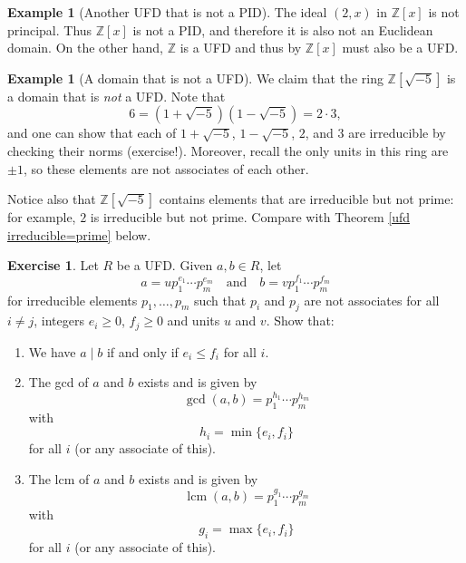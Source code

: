 \documentclass[12pt]{report}
\numberwithin{equation}{section}
\numberwithin{theorem}{chapter}
\theoremstyle{definition}
\newtheorem{example}[theorem]{Example}
\newtheorem{exercise}{Exercise}
\newtheorem*{basic properties}{Basic Properties}
\newtheorem*{Important Remark}{Important Remark}
\DeclareMathOperator{\lcm}{lcm}
\begin{document}
\begin{example}[Another UFD that is not a PID]
The ideal $(2,x)$ in $\mathbb{Z}[x]$ is not principal. Thus $\mathbb{Z}[x]$ is not a PID, and therefore it is also not an Euclidean domain. On the other hand, $\mathbb{Z}$ is a UFD and thus by  $\mathbb{Z}[x]$ must also be a UFD.
\end{example}


\begin{example}[A domain that is not a UFD]
We claim that the ring $\mathbb{Z}[\sqrt{-5}]$ is a domain that is {\em not} a UFD. Note that 
$$6=(1 + \sqrt{-5}) (1 - \sqrt{-5})=2\cdot 3,$$ 
and one can show that each of $1 + \sqrt{-5}$, $1 - \sqrt{-5}$, $2$, and $3$ are irreducible by checking their norms (exercise!). 
Moreover, recall the only units in this ring are $\pm 1$, so these elements are not associates of each other. 

Notice also that $\mathbb{Z}[\sqrt{-5}]$ contains elements that are irreducible but not prime: for example, $2$ is irreducible but not prime. Compare with Theorem
\ref{ufd irreducible=prime} below. 
\end{example}



\begin{exercise} 
Let $R$ be a UFD. Given $a, b \in R$, let
$$a = up_1^{e_1} \cdots p_m^{e_m} \quad \text{and} \quad b = vp_1^{f_1} \cdots p_m^{f_m}$$ 
for irreducible elements $p_1, \dots, p_m$ such that $p_i$ and $p_j$ are not associates for all $i \neq j$, integers $e_i \geqslant 0$, $f_j \geqslant 0$ and units $u$ and $v$. Show that:
\begin{enumerate}
\item We have $a \mid b$ if and only if $e_i \leqslant f_i$ for all $i$.
\item The gcd of $a$ and $b$ exists and is given by 
$$\gcd(a,b) = p_1^{h_1} \cdots p_m^{h_m}$$
with 
$$h_i = \min \{e_i, f_i\}$$ 
for all $i$ (or any associate of this).
\item The lcm of $a$ and $b$ exists and is given by
$$\lcm(a,b) = p_1^{g_1} \cdots p_m^{g_m}$$ 
with 
$$g_i = \max \{ e_i, f_i \}$$ 
for all $i$ (or any associate of this).    
\end{enumerate}
\end{exercise}

%    
%      
\end{document}
